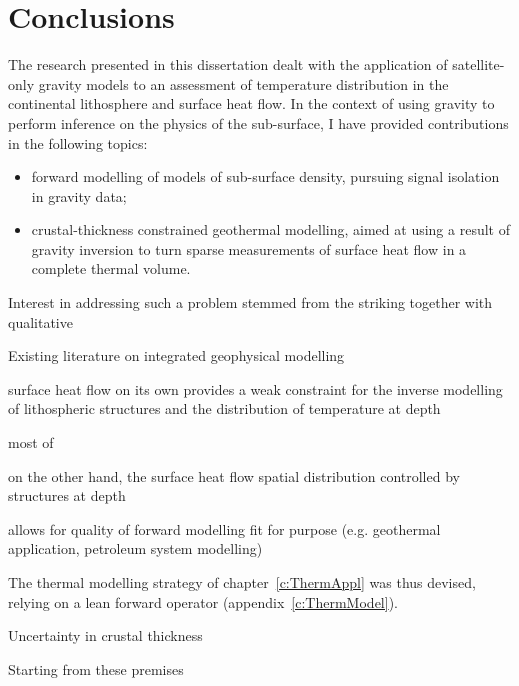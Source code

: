 \chapter{Conclusions}
\label{c:Conclusions}

The research presented in this dissertation dealt with the application of satellite-only gravity models to an assessment of temperature distribution in the continental lithosphere and surface heat flow.
In the context of using gravity to perform inference on the physics of the sub-surface, I have provided contributions in the following topics:
\begin{itemize}
    \item forward modelling of models of sub-surface density, pursuing signal isolation in gravity data;
    \item crustal-thickness constrained geothermal modelling, aimed at using a result of gravity inversion to turn sparse measurements of surface heat flow in a complete thermal volume. 
\end{itemize}

Interest in addressing such a problem stemmed from the striking
together with qualitative

Existing literature on integrated geophysical modelling

surface heat flow on its own provides a weak constraint
for the inverse modelling of lithospheric structures
and the distribution of temperature at depth

most of

on the other hand, the surface heat flow spatial distribution
controlled by structures at depth

allows for
quality of forward modelling
fit for purpose (e.g. geothermal application, petroleum system modelling)

The thermal modelling strategy of chapter~\ref{c:ThermAppl} was thus devised, relying on a lean forward operator (appendix~\ref{c:ThermModel}).

Uncertainty in crustal thickness


Starting from these premises

